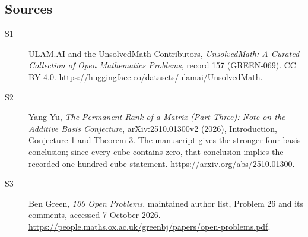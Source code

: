 \documentclass[11pt]{article}
\begin{document}
\subsection{Sources}
\begin{description}
\item[\hypertarget{source:157:1}{S1}] ULAM.AI and the UnsolvedMath Contributors, \emph{UnsolvedMath: A Curated Collection of Open Mathematics Problems}, record 157 (GREEN-069). CC BY 4.0. \url{https://huggingface.co/datasets/ulamai/UnsolvedMath}.
\item[\hypertarget{source:157:2}{S2}] Yang Yu, \emph{The Permanent Rank of a Matrix (Part Three): Note on the Additive Basis Conjecture}, arXiv:2510.01300v2 (2026), Introduction, Conjecture 1 and Theorem 3. The manuscript gives the stronger four-basis conclusion; since every cube contains zero, that conclusion implies the recorded one-hundred-cube statement. \url{https://arxiv.org/abs/2510.01300}.
\item[\hypertarget{source:157:3}{S3}] Ben Green, \emph{100 Open Problems}, maintained author list, Problem 26 and its comments, accessed 7 October 2026. \url{https://people.maths.ox.ac.uk/greenbj/papers/open-problems.pdf}.
\end{description}
\label{end:157}
\end{document}
